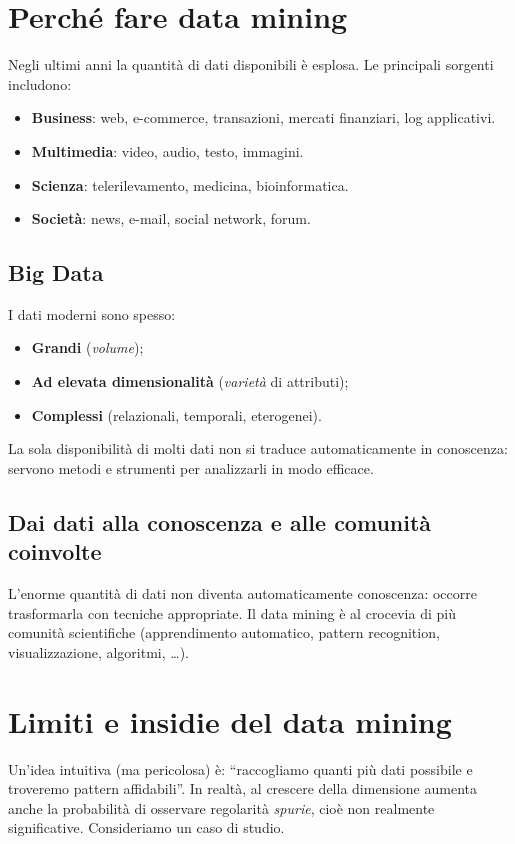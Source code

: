 \section{Perché fare data mining}\label{sec:motivazioni}
Negli ultimi anni la quantità di dati disponibili è esplosa. Le principali sorgenti includono:
\begin{itemize}
  \item \textbf{Business}: web, e-commerce, transazioni, mercati finanziari, log applicativi.
  \item \textbf{Multimedia}: video, audio, testo, immagini.
  \item \textbf{Scienza}: telerilevamento, medicina, bioinformatica.
  \item \textbf{Società}: news, e-mail, social network, forum.
\end{itemize}

\subsection{Big Data}\label{subsec:bigdata}
I dati moderni sono spesso:
\begin{itemize}
  \item \textbf{Grandi} (\emph{volume});
  \item \textbf{Ad elevata dimensionalità} (\emph{varietà} di attributi);
  \item \textbf{Complessi} (relazionali, temporali, eterogenei).
\end{itemize}
La sola disponibilità di molti dati non si traduce automaticamente in conoscenza: servono metodi e strumenti per analizzarli in modo efficace.

\subsection{Dai dati alla conoscenza e alle comunità coinvolte}\label{subsec:comunita}
L'enorme quantità di dati non diventa automaticamente conoscenza: occorre trasformarla con tecniche appropriate. Il data mining è al crocevia di più comunità scientifiche (apprendimento automatico, pattern recognition, visualizzazione, algoritmi, \ldots).

\section{Limiti e insidie del data mining}\label{sec:limiti}
Un'idea intuitiva (ma pericolosa) è: ``raccogliamo quanti più dati possibile e troveremo pattern affidabili''. In realtà, al crescere della dimensione aumenta anche la probabilità di osservare regolarità \emph{spurie}, cioè non realmente significative. Consideriamo un caso di studio.

